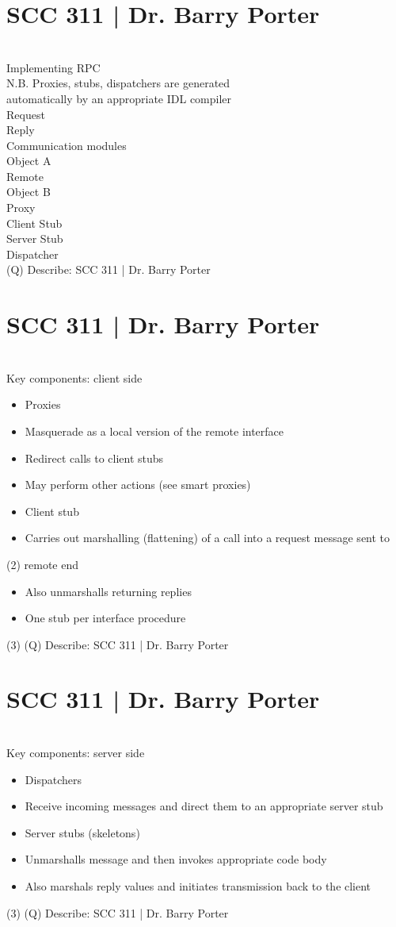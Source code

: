 \documentclass[12pt]{article}
\begin{document}
\section{SCC 311 | Dr. Barry Porter}
\\
Implementing RPC\\
N.B. Proxies, stubs, dispatchers are generated \\
automatically by an appropriate IDL compiler\\
Request\\
Reply\\
Communication modules\\
Object A\\
Remote \\
Object B\\
Proxy\\
Client Stub\\
Server Stub\\
Dispatcher\\
\clearpage
(Q)
Describe: SCC 311 | Dr. Barry Porter
\clearpage
\section{SCC 311 | Dr. Barry Porter}
\\
Key components: client side\\
\begin{itemize}
  \item Proxies
  \item Masquerade as a local version of the remote interface
  \item Redirect calls to client stubs
  \item May perform other actions (see smart proxies)
  \item Client stub
  \item Carries out marshalling (flattening) of a call into a request message sent to 
\end{itemize}(2)
remote end\\
\begin{itemize}
  \item Also unmarshalls returning replies
  \item One stub per interface procedure
\end{itemize}(3)
\clearpage
(Q)
Describe: SCC 311 | Dr. Barry Porter
\clearpage
\section{SCC 311 | Dr. Barry Porter}
\\
Key components: server side\\
\begin{itemize}
  \item Dispatchers
  \item Receive incoming messages and direct them to an appropriate server stub
  \item Server stubs (skeletons)
  \item Unmarshalls message and then invokes appropriate code body
  \item Also marshals reply values and initiates transmission back to the client
\end{itemize}(3)
\clearpage
(Q)
Describe: SCC 311 | Dr. Barry Porter
\clearpage
\end{document}
